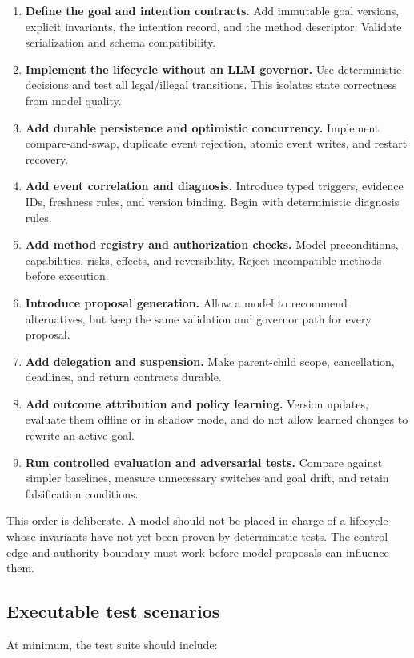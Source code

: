 \begin{enumerate}
  \item \textbf{Define the goal and intention contracts.} Add immutable goal versions, explicit invariants, the intention record, and the method descriptor. Validate serialization and schema compatibility.
  \item \textbf{Implement the lifecycle without an LLM governor.} Use deterministic decisions and test all legal/illegal transitions. This isolates state correctness from model quality.
  \item \textbf{Add durable persistence and optimistic concurrency.} Implement compare-and-swap, duplicate event rejection, atomic event writes, and restart recovery.
  \item \textbf{Add event correlation and diagnosis.} Introduce typed triggers, evidence IDs, freshness rules, and version binding. Begin with deterministic diagnosis rules.
  \item \textbf{Add method registry and authorization checks.} Model preconditions, capabilities, risks, effects, and reversibility. Reject incompatible methods before execution.
  \item \textbf{Introduce proposal generation.} Allow a model to recommend alternatives, but keep the same validation and governor path for every proposal.
  \item \textbf{Add delegation and suspension.} Make parent-child scope, cancellation, deadlines, and return contracts durable.
  \item \textbf{Add outcome attribution and policy learning.} Version updates, evaluate them offline or in shadow mode, and do not allow learned changes to rewrite an active goal.
  \item \textbf{Run controlled evaluation and adversarial tests.} Compare against simpler baselines, measure unnecessary switches and goal drift, and retain falsification conditions.
\end{enumerate}

This order is deliberate. A model should not be placed in charge of a lifecycle whose invariants have not yet been proven by deterministic tests. The control edge and authority boundary must work before model proposals can influence them.

\subsection{Executable test scenarios}

At minimum, the test suite should include:

